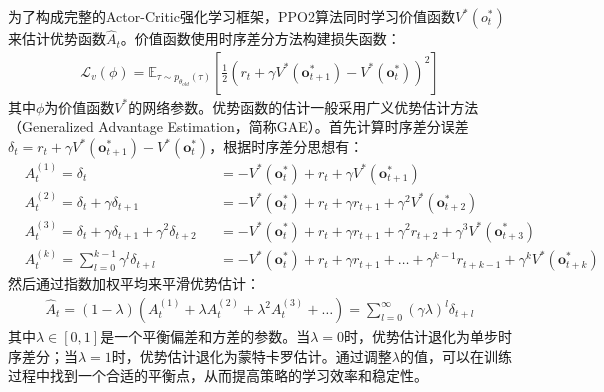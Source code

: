 为了构成完整的Actor-Critic强化学习框架，PPO2算法同时学习价值函数$V^{\ast}(o^\ast_t)$来估计优势函数$\hat{A}_t$。价值函数使用时序差分方法构建损失函数：
\begin{equation}
\begin{aligned}
\mathcal{L}_{v}(\phi)=\mathbb{E}_{\tau\sim p_{\theta_{old}}(\tau)}\left[\frac{1}{2}(r_t+\gamma V^\ast(\boldsymbol{o}^\ast_{t+1})-V^\ast(\boldsymbol{o}^\ast_t))^2\right]
\end{aligned}
\end{equation}
其中$\phi$为价值函数$V^{\ast}$的网络参数。优势函数的估计一般采用广义优势估计方法\cite{schulman2015high}（Generalized Advantage Estimation，简称GAE）。首先计算时序差分误差$\delta_t=r_t+\gamma V^\ast(\boldsymbol{o}^\ast_{t+1})-V^\ast(\boldsymbol{o}^\ast_t)$，根据时序差分思想有：
\begin{equation}
\begin{aligned}
 & A_{t}^{(1)}=\delta_{t} & & =-V^\ast(\boldsymbol{o}^\ast_t)+r_t+\gamma V^\ast(\boldsymbol{o}^\ast_{t+1}) \\
 & A_{t}^{(2)}=\delta_t+\gamma\delta_{t+1} & & =-V^\ast(\boldsymbol{o}^\ast_t)+r_t+\gamma r_{t+1}+\gamma^2V^\ast(\boldsymbol{o}^\ast_{t+2}) \\
 & A_t^{(3)}=\delta_t+\gamma\delta_{t+1}+\gamma^2\delta_{t+2} & & =-V^\ast(\boldsymbol{o}^\ast_t)+r_t+\gamma r_{t+1}+\gamma^2r_{t+2}+\gamma^3V^\ast(\boldsymbol{o}^\ast_{t+3}) \\
 & A_{t}^{(k)}=\sum_{l=0}^{k-1}\gamma^l\delta_{t+l} & & =-V^\ast(\boldsymbol{o}^\ast_t)+r_t+\gamma r_{t+1}+\ldots+\gamma^{k-1}r_{t+k-1}+\gamma^kV^\ast(\boldsymbol{o}^\ast_{t+k})
\end{aligned}
\end{equation}
然后通过指数加权平均来平滑优势估计：
\begin{equation}
\begin{aligned}
\hat{A}_t=(1-\lambda)(A_{t}^{(1)}+\lambda A_{t}^{(2)}+\lambda^2 A_{t}^{(3)}+\ldots)=\sum_{l=0}^{\infty}(\gamma\lambda)^l \delta_{t+l}
\label{equ:gae}
\end{aligned}
\end{equation}
其中$\lambda\in[0,1]$是一个平衡偏差和方差的参数。当$\lambda=0$时，优势估计退化为单步时序差分；当$\lambda=1$时，优势估计退化为蒙特卡罗估计。通过调整$\lambda$的值，可以在训练过程中找到一个合适的平衡点，从而提高策略的学习效率和稳定性。

